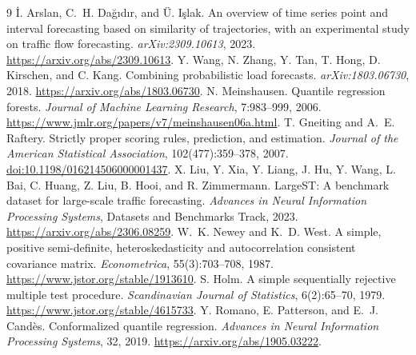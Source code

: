 \documentclass[11pt]{article}
\begin{document}
\begin{thebibliography}{9}
\small
{} \.I. Arslan, C.~H. Da\u{g}{\i}d{\i}r, and \"U. I\c{s}lak.
An overview of time series point and interval forecasting based on similarity of trajectories, with an experimental study on traffic flow forecasting.
\emph{arXiv:2309.10613}, 2023. \url{https://arxiv.org/abs/2309.10613}.
 Y. Wang, N. Zhang, Y. Tan, T. Hong, D. Kirschen, and C. Kang.
Combining probabilistic load forecasts. \emph{arXiv:1803.06730}, 2018.
\url{https://arxiv.org/abs/1803.06730}.
 N. Meinshausen. Quantile regression forests.
\emph{Journal of Machine Learning Research}, 7:983--999, 2006.
\url{https://www.jmlr.org/papers/v7/meinshausen06a.html}.
 T. Gneiting and A.~E. Raftery. Strictly proper scoring rules, prediction, and estimation.
\emph{Journal of the American Statistical Association}, 102(477):359--378, 2007.
\href{https://doi.org/10.1198/016214506000001437}{doi:10.1198/016214506000001437}.
 X. Liu, Y. Xia, Y. Liang, J. Hu, Y. Wang, L. Bai, C. Huang, Z. Liu, B. Hooi, and R. Zimmermann.
LargeST: A benchmark dataset for large-scale traffic forecasting.
\emph{Advances in Neural Information Processing Systems}, Datasets and Benchmarks Track, 2023.
\url{https://arxiv.org/abs/2306.08259}.
 W.~K. Newey and K.~D. West.
A simple, positive semi-definite, heteroskedasticity and autocorrelation consistent covariance matrix.
\emph{Econometrica}, 55(3):703--708, 1987.
\url{https://www.jstor.org/stable/1913610}.
 S. Holm. A simple sequentially rejective multiple test procedure.
\emph{Scandinavian Journal of Statistics}, 6(2):65--70, 1979.
\url{https://www.jstor.org/stable/4615733}.
 Y. Romano, E. Patterson, and E.~J. Cand\`es. Conformalized quantile regression.
\emph{Advances in Neural Information Processing Systems}, 32, 2019.
\url{https://arxiv.org/abs/1905.03222}.
\end{thebibliography}
\end{document}
